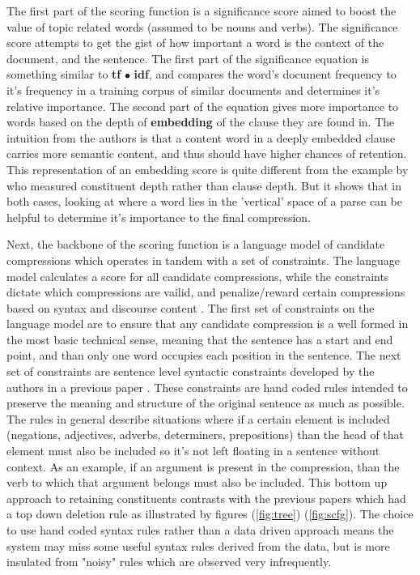{The first part of the scoring function is a significance score aimed to boost the value of topic related words (assumed to be nouns and verbs).  The significance score attempts to get the gist of how important a word is the context of the document, and the sentence.  The first part of the significance equation is something similar to  \textbf{tf} $ \bullet $ \textbf{idf}, and compares the word's document frequency to it's frequency in a training corpus of similar documents and determines it's relative importance.  The second part of the equation gives more importance to words based on the depth of \textbf{embedding} of the clause they are found in.  The intuition from the authors is that a content word in a deeply embedded clause carries more semantic content, and thus should have higher chances of retention.  This representation of an embedding score is quite different from the example by \citet{galley2007lexicalized} who measured constituent depth rather than clause depth. But it shows that in both cases, looking at where a word lies in the 'vertical' space of a parse can be helpful to determine it's importance to the final compression.}

{Next, the backbone of the scoring function is a language model of candidate compressions which operates in tandem with a set of constraints.  The language model calculates a score for all  candidate compressions, while the constraints dictate which compressions are vailid, and penalize/reward certain compressions based on syntax and discourse content \citep{Clarke:2010:DCD:1950488.1950493}. The first set of constraints on the language model are to ensure that any candidate compression is a well formed in the most basic technical sense, meaning that the sentence has a start and end point, and than only one word occupies each position in the sentence.  The next set of constraints are sentence level syntactic constraints developed by the authors in a previous paper \citep{Clarke:2008:GIS:1622655.1622667}.  These constraints are hand coded rules intended to preserve the meaning and structure of the original sentence as much as possible.  The rules in general describe situations where if a certain element is included (negations, adjectives, adverbs, determiners, prepositions) than the head of that element must also be included so it's not left floating in a sentence without context. As an example, if an argument is present in the compression, than the verb to which that argument belongs must also be included.  This bottom up approach to retaining constituents contrasts with the previous papers which had a top down deletion rule as illustrated by figures (\ref{fig:tree}) (\ref{fig:scfg}). The choice to use hand coded syntax rules rather than a data driven approach means the system may miss some useful syntax rules derived from the data, but is more insulated from "noisy" rules which are observed very infrequently.}


